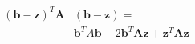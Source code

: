 \documentclass[10pt]{article}
\begin{document}
\begin{align*}\begin{split}
\left( \boldsymbol b - \boldsymbol z \right)^T \boldsymbol A & \left( \boldsymbol b - \boldsymbol z \right) = \\
& \boldsymbol b^T A \boldsymbol b -2 \boldsymbol b^T \boldsymbol A \boldsymbol z + \boldsymbol z^T \boldsymbol A \boldsymbol z \\
\end{split}\end{align*}
\end{document}
